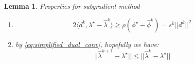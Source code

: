 \documentclass[
  a4paper,
,tablecaptionabove
]{scrartcl}
\numberwithin{equation}{section}
\newtheorem{lemma}[theorem]{Lemma}
\begin{document}
\begin{lemma} \label{prop1}
  Properties for subgradient method\\
  \begin{enumerate}
    \item
          \begin{equation}\label{eq:simplified_dual_conv}
            2 \langle d^k, \lambda^\star - \hat \lambda^k \rangle \ge \rho (\phi^\star - \hat \phi^k) =  s^k ||d^k||^2
          \end{equation}
    \item by \eqref{eq:simplified_dual_conv}, hopefully we have:
          \begin{equation}\label{eq:dual_conv}
            ||\hat \lambda^{k+1} - \lambda^\star|| \le ||\hat \lambda^{k} - \lambda^\star||
          \end{equation}
  \end{enumerate}
\end{lemma}


\end{document}
